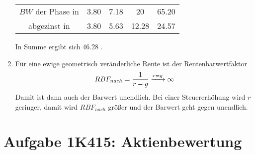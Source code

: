 \documentclass{article}
\begin{document}
\begin{enumerate}[label=(\alph*)]
\begin{center}
\begin{tabular}{c|c|c|c|c}
				$BW$ der Phase in \EUR & 3.80 & 7.18 & 20 & 65.20 \\
				abgezinst in \EUR & 3.80 & 5.63 & 12.28 & 24.57
			\end{tabular}
		\end{center}
		In Summe ergibt sich 46.28 \EUR. 
		\item Für eine ewige geometrisch veränderliche Rente ist der Rentenbarwertfaktor
		\begin{align}
			RBF_{nach} = \frac{1}{r-g} \xrightarrow{r=g} \infty \notag
		\end{align}
		Damit ist dann auch der Barwert unendlich. Bei einer Steuererhöhung wird $r$ geringer, damit wird $RBF_{nach}$ größer und der Barwert geht gegen unendlich.
	\end{enumerate}
	
	
	\section*{Aufgabe 1K415: Aktienbewertung}
\end{document}
